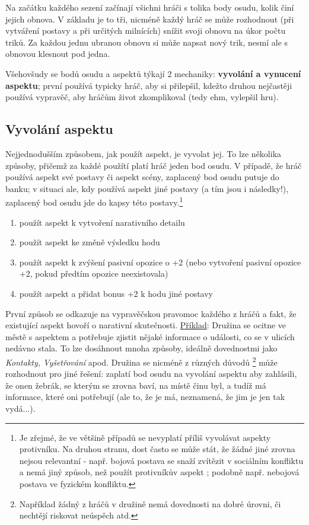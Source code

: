 \documentclass[../main.tex]{subfiles}
\begin{document}
Na začátku každého sezení začínají všichni hráči s tolika body osudu, kolik činí jejich obnova. V základu je to tři, nicméně každý hráč se může rozhodnout (při vytváření postavy a při určitých milnících) snížit svoji obnovu na úkor počtu triků. Za každou jednu ubranou obnovu si může napsat nový trik, nesmí ale s obnovou klesnout pod jedna.

Všehovšudy se bodů osudu a aspektů týkají 2 mechaniky: \textbf{vyvolání a vynucení aspektu}; první používá typicky hráč, aby si přilepšil, kdežto druhou nejčastěji používá vypravěč, aby hráčům život zkomplikoval (tedy ehm, vylepšil hru).

\subsection{Vyvolání aspektu}
\label{sec:vyvolani-aspektu}

Nejjednodušším způsobem, jak použít aspekt, je vyvolat jej. To lze několika způsoby, přičemž za každé použítí platí hráč jeden bod osudu. V případě, že hráč používá aspekt své postavy či aspekt scény, zaplacený bod osudu putuje do banku; v situaci ale, kdy používá aspekt jiné postavy (a tím jsou i následky!), zaplacený bod osudu jde do kapsy této postavy.\footnote{Je zřejmé, že ve většině případů se nevyplatí příliš vyvolávat aspekty protivníku. Na druhou stranu, dost často se může stát, že žádné jiné zrovna nejsou relevantní - např. bojová postava se snaží zvítězit v sociálním konfliktu a nemá jiný způsob, než použít protivníkův aspekt ; podobně např. nebojová postava ve fyzickém konfliktu.}

\begin{enumerate}
\item použít aspekt k vytvoření narativního detailu
\item použít aspekt ke změně výsledku hodu
\item použít aspekt k zvýšení pasivní opozice o +2 (nebo vytvoření pasivní opozice +2, pokud předtím opozice neexistovala)
\item použít aspekt a přidat bonus +2 k hodu jiné postavy
\end{enumerate}

První způsob se odkazuje na vypravěčskou pravomoc každého z hráčů a fakt, že existující aspekt hovoří o narativní skutečnosti. \underline{Příklad}:
Družina se ocitne ve městě s aspektem  a potřebuje zjistit nějaké informace o události, co se v ulicích nedávno stala. To lze dosáhnout mnoha způsoby, ideálně dovednostmi jako \textit{Kontakty, Vyšetřování} apod. Družina se nicméně z různých důvodů \footnote{Například žádný z hráčů v družině nemá dovednosti na dobré úrovni, či nechtějí riskovat neúspěch atd.} může rozhodnout pro jiné řešení: zaplatí bod osudu na vyvolání aspektu  aby zahlásili, že onen žebrák, se kterým se zrovna baví, na místě činu byl, a tudíž má informace, které oni potřebují (ale to, že je má, neznamená, že jim je jen tak vydá...).\\
\end{document}
